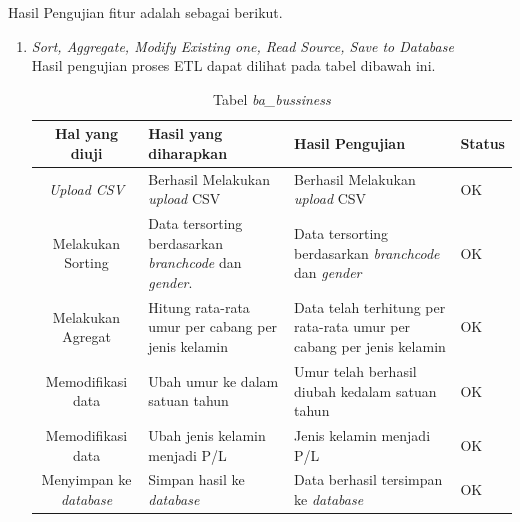 Hasil Pengujian fitur adalah sebagai berikut.
\begin{enumerate}
	\item \textit{Sort, Aggregate, Modify Existing one, Read Source, Save to Database}\\
	Hasil pengujian proses ETL dapat dilihat pada tabel dibawah ini.
	
	\begin{table}[H]
	\centering
		\caption{Tabel \textit{ba\_bussiness}}
		\begin{tabular}{ | c | p{3cm}| p{3cm}| p{3cm} | }
			\hline
				Hal yang diuji & Hasil yang diharapkan & Hasil Pengujian & Status \\ \hline \hline
			 \textit{Upload CSV} & Berhasil Melakukan \textit{upload} CSV & Berhasil Melakukan \textit{upload} CSV & OK \\ \hline
				Melakukan Sorting & Data tersorting berdasarkan \textit{branchcode} dan \textit{gender}. & Data tersorting berdasarkan \textit{branchcode} dan \textit{gender} & OK \\ \hline
				Melakukan Agregat & Hitung rata-rata umur per cabang per jenis kelamin & Data telah terhitung per rata-rata umur per cabang per jenis kelamin & OK \\ \hline
				Memodifikasi data & Ubah umur ke dalam satuan tahun & Umur telah berhasil diubah kedalam satuan tahun & OK \\ \hline
				Memodifikasi data & Ubah jenis kelamin menjadi P/L & Jenis kelamin menjadi P/L & OK \\ \hline
				Menyimpan ke \textit{database} & Simpan hasil ke \textit{database} & Data berhasil tersimpan ke \textit{database}& OK\\ \hline
			
		\end{tabular}
\end{table}
\end{enumerate}
	
